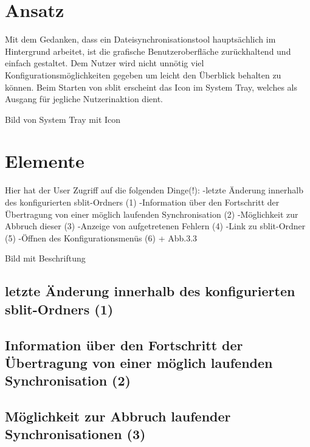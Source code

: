 
\section{Ansatz}

%
%

Mit dem Gedanken, dass ein Dateisynchronisationstool hauptsächlich im Hintergrund arbeitet, ist die grafische Benutzeroberfläche zurückhaltend und einfach gestaltet. Dem Nutzer wird nicht unnötig viel Konfigurationsmöglichkeiten gegeben um leicht den Überblick behalten zu können. 
Beim Starten von sblit erscheint das Icon im System Tray, welches als Ausgang für jegliche Nutzerinaktion dient.

{Bild von System Tray mit Icon}

%
%

\section{Elemente}

Hier hat der User Zugriff auf die folgenden Dinge(!):
-letzte Änderung innerhalb des konfigurierten sblit-Ordners (1)
-Information über den Fortschritt der Übertragung von einer möglich laufenden Synchronisation (2)
-Möglichkeit zur Abbruch dieser (3)
-Anzeige von aufgetretenen Fehlern (4)
-Link zu sblit-Ordner (5)
-Öffnen des Konfigurationsmenüs  (6) + Abb.3.3

{Bild mit Beschriftung}

%
%
\subsection{letzte Änderung innerhalb des konfigurierten sblit-Ordners (1)}

\subsection{Information über den Fortschritt der Übertragung von einer möglich laufenden Synchronisation (2)}

\subsection{Möglichkeit zur Abbruch laufender Synchronisationen (3)}

